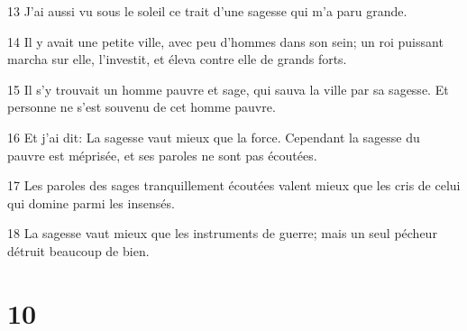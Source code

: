 \par 13 J'ai aussi vu sous le soleil ce trait d'une sagesse qui m'a paru grande.
\par 14 Il y avait une petite ville, avec peu d'hommes dans son sein; un roi puissant marcha sur elle, l'investit, et éleva contre elle de grands forts.
\par 15 Il s'y trouvait un homme pauvre et sage, qui sauva la ville par sa sagesse. Et personne ne s'est souvenu de cet homme pauvre.
\par 16 Et j'ai dit: La sagesse vaut mieux que la force. Cependant la sagesse du pauvre est méprisée, et ses paroles ne sont pas écoutées.
\par 17 Les paroles des sages tranquillement écoutées valent mieux que les cris de celui qui domine parmi les insensés.
\par 18 La sagesse vaut mieux que les instruments de guerre; mais un seul pécheur détruit beaucoup de bien.

\chapter{10}


